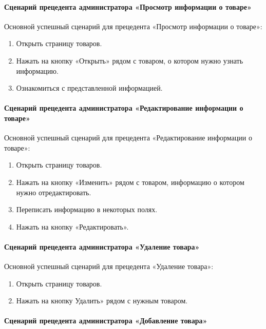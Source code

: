 \paragraph{Сценарий прецедента администратора «Просмотр информации о товаре»}

Основной успешный сценарий для прецедента «Просмотр информации о товаре»:
\begin{enumerate}
	\item Открыть страницу товаров.
	\item Нажать на кнопку «Открыть» рядом с товаром, о котором нужно узнать информацию.
	\item Ознакомиться с представленной информацией.
\end{enumerate}

\paragraph{Сценарий прецедента администратора «Редактирование информации о товаре»}

Основной успешный сценарий для прецедента «Редактирование информации о товаре»:
\begin{enumerate}
	\item Открыть страницу товаров.
	\item Нажать на кнопку «Изменить» рядом с товаром, информацию о котором нужно отредактировать.
	\item Переписать информацию в некоторых полях.
	\item Нажать на кнопку «Редактировать».
\end{enumerate}

\paragraph{Сценарий прецедента администратора «Удаление товара»}

Основной успешный сценарий для прецедента «Удаление товара»:
\begin{enumerate}
	\item Открыть страницу товаров.
	\item Нажать на кнопку Удалить» рядом с нужным товаром.
\end{enumerate}

\paragraph{Сценарий прецедента администратора «Добавление товара»}

